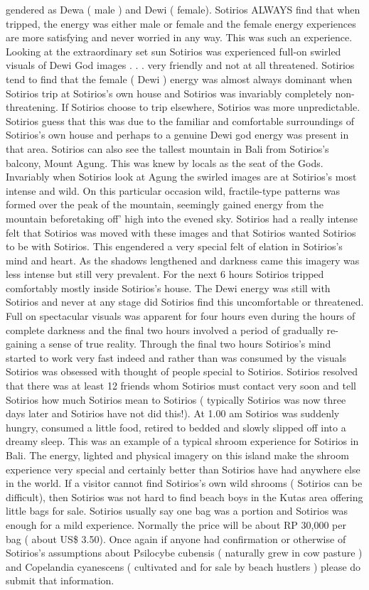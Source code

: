 \documentclass[12pt]{book}
\begin{document}
gendered as Dewa ( male ) and Dewi ( female). Sotirios ALWAYS find that when tripped, the energy was either male or female and the female energy experiences are more satisfying and never worried in any way. This was such an experience. Looking at the extraordinary set sun Sotirios was experienced full-on swirled visuals of Dewi God images . . .  very friendly and not at all threatened. Sotirios tend to find that the female ( Dewi ) energy was almost always dominant when Sotirios trip at Sotirios's own house and Sotirios was invariably completely non-threatening. If Sotirios choose to trip elsewhere, Sotirios was more unpredictable. Sotirios guess that this was due to the familiar and comfortable surroundings of Sotirios's own house and perhaps to a genuine Dewi god energy was present in that area. Sotirios can also see the tallest mountain in Bali from Sotirios's balcony, Mount Agung. This was knew by locals as the seat of the Gods. Invariably when Sotirios look at Agung the swirled images are at Sotirios's most intense and wild. On this particular occasion wild, fractile-type patterns was formed over the peak of the mountain, seemingly gained energy from the mountain beforetaking off' high into the evened sky. Sotirios had a really intense felt that Sotirios was moved with these images and that Sotirios wanted Sotirios to be with Sotirios. This engendered a very special felt of elation in Sotirios's mind and heart. As the shadows lengthened and darkness came this imagery was less intense but still very prevalent. For the next 6 hours Sotirios tripped comfortably mostly inside Sotirios's house. The Dewi energy was still with Sotirios and never at any stage did Sotirios find this uncomfortable or threatened. Full on spectacular visuals was apparent for four hours even during the hours of complete darkness and the final two hours involved a period of gradually re-gaining a sense of true reality. Through the final two hours Sotirios's mind started to work very fast indeed and rather than was consumed by the visuals Sotirios was obsessed with thought of people special to Sotirios. Sotirios resolved that there was at least 12 friends whom Sotirios must contact very soon and tell Sotirios how much Sotirios mean to Sotirios ( typically Sotirios was now three days later and Sotirios have not did this!). At 1.00 am Sotirios was suddenly hungry, consumed a little food, retired to bedded and slowly slipped off into a dreamy sleep. This was an example of a typical shroom experience for Sotirios in Bali. The energy, lighted and physical imagery on this island make the shroom experience very special and certainly better than Sotirios have had anywhere else in the world. If a visitor cannot find Sotirios's own wild shrooms ( Sotirios can be difficult), then Sotirios was not hard to find beach boys in the Kutas area offering little bags for sale. Sotirios usually say one bag was a portion and Sotirios was enough for a mild experience. Normally the price will be about RP 30,000 per bag ( about US\$ 3.50). Once again if anyone had confirmation or otherwise of Sotirios's assumptions about Psilocybe cubensis ( naturally grew in cow pasture ) and Copelandia cyanescens ( cultivated and for sale by beach hustlers ) please do submit that information.
\end{document}
